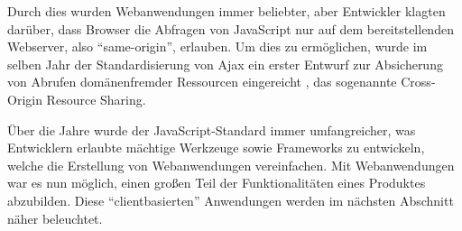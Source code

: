 Durch dies wurden Webanwendungen immer beliebter, aber Entwickler klagten darüber, dass Browser die Abfragen von JavaScript nur auf dem bereitstellenden Webserver, also \enquote{same-origin}, erlauben\cite{CrossSiteXHRWithCORS}. Um dies zu ermöglichen, wurde im selben Jahr der Standardisierung von Ajax ein erster Entwurf zur Absicherung von Abrufen domänenfremder Ressourcen eingereicht \cite{AuthorizingCORS}, das sogenannte Cross-Origin Resource Sharing.

Über die Jahre wurde der JavaScript-Standard immer umfangreicher, was Entwicklern erlaubte mächtige Werkzeuge sowie Frameworks zu entwickeln, welche die Erstellung von Webanwendungen vereinfachen. Mit Webanwendungen war es nun möglich, einen großen Teil der Funktionalitäten eines Produktes abzubilden. Diese \enquote{clientbasierten} Anwendungen werden im nächsten Abschnitt näher beleuchtet.


%
